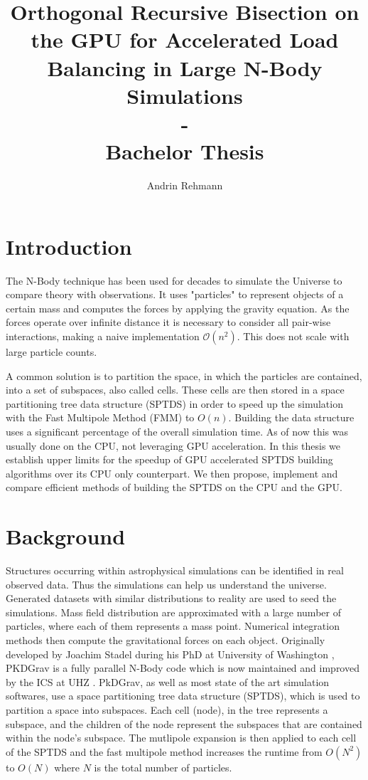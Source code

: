 \documentclass[]{article}
\title{Orthogonal Recursive Bisection on the GPU for Accelerated Load Balancing in Large N-Body Simulations \\ - \\ Bachelor Thesis}
\author{Andrin Rehmann}
\begin{document}
\maketitle

\newpage

\tableofcontents

\newpage
\section{Introduction}


The N-Body technique has been used for decades to simulate the Universe to compare theory with observations. It uses "particles" to represent objects of a certain mass and computes the forces by applying the gravity equation. As the forces operate over infinite distance it is necessary to consider all pair-wise interactions, making a naive implementation $\mathcal{O}(n^2)$. This does not scale with large particle counts.

A common solution is to partition the space, in which the particles are contained, into a set of subspaces, also called cells. These cells are then stored in a space partitioning tree data structure (SPTDS) in order to speed up the simulation with the Fast Multipole Method (FMM) to $O(n)$. 
Building the data structure uses a significant percentage of the overall simulation time. As of now this was usually done on the CPU, not leveraging GPU acceleration. 
In this thesis we establish upper limits for the speedup of GPU accelerated SPTDS building algorithms over its CPU only counterpart. We then propose, implement and compare efficient methods of building the SPTDS on the CPU and the GPU.


\newpage
\section{Background}

Structures occurring within astrophysical simulations can be identified in real observed data\cite{Stadel2001}. Thus the simulations can help us understand the universe. Generated datasets with similar distributions to reality are used to seed the simulations. Mass field distribution are approximated with a large number of particles, where each of them represents a mass point. Numerical integration methods then compute the gravitational forces on each object.
Originally developed by Joachim Stadel during his PhD at University of Washington \cite{Stadel2001}, PKDGrav is a fully parallel N-Body code which is now maintained and improved by the ICS at UHZ \cite{ICS}. 
PkDGrav, as well as most state of the art simulation softwares, use a space partitioning tree data structure (SPTDS), which is used to partition a space into subspaces. Each cell (node), in the tree represents a subspace, and the children of the node represent the subspaces that are contained within the node's subspace. The mutlipole expansion is then applied to each cell of the SPTDS and the fast multipole method increases the runtime from $O(N^2)$ to $O(N)$ where $N$ is the total number of particles. \cite{Stadel2001}
\end{document}
